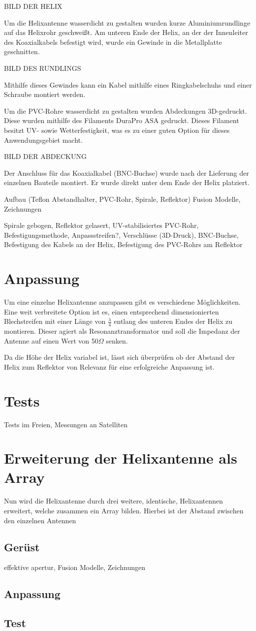 BILD DER HELIX

Um die Helixantenne wasserdicht zu gestalten wurden kurze Aluminiumrundlinge auf das Helixrohr geschweißt. Am unteren Ende der Helix, an der der Innenleiter des Koaxialkabels befestigt wird, wurde ein Gewinde in die Metallplatte geschnitten.

BILD DES RUNDLINGS	

Mithilfe dieses Gewindes kann ein Kabel mithilfe eines Ringkabelschuhs und einer Schraube montiert werden.

Um die PVC-Rohre wasserdicht zu gestalten wurden Abdeckungen 3D-gedruckt. Diese wurden mithilfe des Filaments DuraPro ASA gedruckt. Dieses Filament besitzt UV- sowie Wetterfestigkeit, was es zu einer guten Option für dieses Anwendungsgebiet macht.

BILD DER ABDECKUNG

Der Anschluss für das Koaxialkabel (BNC-Buchse) wurde nach der Lieferung der einzelnen Bauteile montiert. Er wurde direkt unter dem Ende der Helix platziert. 

Aufbau (Teflon Abstandhalter, PVC-Rohr, Spirale, Reflektor) Fusion Modelle, Zeichnungen

Spirale gebogen, Reflektor gelasert, UV-stabilisiertes PVC-Rohr, Befestigungsmethode, Anpassstreifen?, Verschlüsse (3D-Druck), BNC-Buchse, Befestigung des Kabels an der Helix, Befestigung des PVC-Rohrs am Reflektor

\section{Anpassung}
Um eine einzelne Helixantenne anzupassen gibt es verschiedene Möglichkeiten. Eine weit verbreitete Option ist es, einen entsprechend dimensionierten Blechstreifen mit einer Länge von $\frac{\lambda}{4}$ entlang des unteren Endes der Helix zu montieren. Dieser agiert als Resonanztransformator und soll die Impedanz der Antenne auf einen Wert von 50$\Omega$ senken.

Da die Höhe der Helix variabel ist, lässt sich überprüfen ob der Abstand der Helix zum Reflektor von Relevanz für eine erfolgreiche Anpassung ist. 

\section{Tests}
Tests im Freien, Messungen an Satelliten

\section{Erweiterung der Helixantenne als Array}
Nun wird die Helixantenne durch drei weitere, identische, Helixantennen erweitert, welche zusammen ein Array bilden. Hierbei ist der Abstand zwischen den einzelnen Antennen 

\subsection{Gerüst}
effektive apertur, Fusion Modelle, Zeichnungen

\subsection{Anpassung}

\subsection{Test}